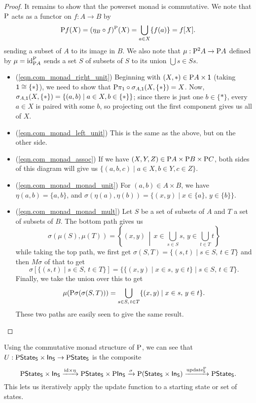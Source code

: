 \documentclass[DynamicalBook]{subfiles}
\begin{document}
\begin{proof}
It remains to show that the powerset monad is commutative. We note that
$\mathrm{P}$ acts as a functor on $f : A \to B$ by 
\[
\mathrm{P} f (X) = (\eta_B \circ
f)^{\mathrm{P}}(X) = \bigcup_{a \in X}\{f(a)\} = f[X].
\]
sending a subset of $A$ to its image in $B$. We also note that $\mu : \mathrm{P}^2
A \to \mathrm{P} A$ defined by $\mu = \mathrm{id}_{\mathrm{P} A}^{\mathrm{P}}$ sends a set $S$
of subsets of $S$ to its union $\bigcup{s \in S} s$.
\begin{itemize}
  \item (\cref{eqn.com_monad_right_unit}) Beginning with $(X, \ast) \in \mathrm{P}
    A \times \mathsf{1}$ (taking $\mathsf{1} \cong \{\ast\}$), we need to
    show that $\mathrm{P} \pi_1 \circ \sigma_{A, \mathsf{1}}(X, \{\ast\}) = X$. Now,
    $\sigma_{A, \mathsf{1}}(X, \{\ast\}) = \{(a, b) \mid a \in X, b \in \{\ast\}\}$; since
    there is just one $b \in \{\ast\}$, every $a \in X$ is paired with
    some $b$, so projecting out the first component gives us all of $X$.
    \item (\cref{eqn.com_monad_left_unit}) This is the same as the above, but on the other side.
    \item (\cref{eqn.com_monad_assoc}) If we have $(X, Y, Z) \in \mathrm{P} A \times \mathrm{P} B \times \mathrm{P}
      C$, both sides of this diagram will give us $\{(a, b, c) \mid a \in X, b
      \in Y, c \in Z\}$. 
    \item (\cref{eqn.com_monad_monad_unit}) For $(a, b) \in A \times B$, we have
      $\eta(a, b) = \{a, b\}$, and $\sigma(\eta(a), \eta(b)) = \{(x, y) \mid x
      \in \{a\},\, y \in \{b\}\}$.
   \item (\cref{eqn.com_monad_monad_mult}) Let $S$ be a set of subsets of $A$
     and $T$ a set of subsets of $B$. The bottom path gives us
     \[
\sigma(\mu(S), \mu(T)) = \left\{(x, y) \,\middle|\, x \in \bigcup_{s \in S} s,\, y \in \bigcup_{t \in T} t\right\}
\]
while taking the top path, we first get $\sigma(S, T) = \{(s, t) \mid s \in S,\,
t \in T\}$ and then $M\sigma$ of that to get
\[
\sigma\left[ \{(s, t) \mid s \in S,\, t \in T\} \right] = \{\{(x, y) \mid x \in
s,\, y \in t\} \mid s \in S,\, t \in T\}.
\]
Finally, we take the union over this to get
\[
\mu(\mathrm{P} \sigma(\sigma(S, T))) = \bigcup_{s \in S,\, t \in T}\{(x, y) \mid x \in s,\, y \in t\}.
\]
These two paths are easily seen to give the same result.
\end{itemize}
\end{proof}

Using the commutative monad structure of $\mathrm{P}$, we can see that $U : \mathrm{P}
\mathsf{State}_{\mathsf{S}} \times \mathsf{In}_{\mathsf{S}} \to \mathrm{P} \mathsf{State}_{\mathsf{S}}$ is the composite
$$\mathrm{P} \mathsf{State}_{\mathsf{S}} \times \mathsf{In}_{\mathsf{S}} \xrightarrow{\mathrm{id} \times \eta}
\mathrm{P}\mathsf{State}_{\mathsf{S}} \times \mathrm{P}\mathsf{In}_{\mathsf{S}} \xrightarrow{\sigma} \mathrm{P}(\mathsf{State}_{\mathsf{S}} \times
\mathsf{In}_{\mathsf{S}}) \xrightarrow{\mathrm{update}_{\mathsf{S}}^{\mathrm{P}}} \mathrm{P}\mathsf{State}_{\mathsf{S}}.$$
This lets us iteratively apply the update function to a starting state or set of
states.
\end{document}
